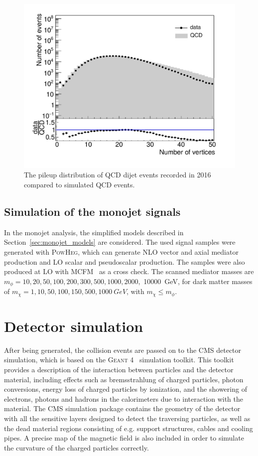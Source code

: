 \begin{itemize}
\begin{figure}[ht]
  \centering
 \includegraphics[width=.75\textwidth]{pileup.pdf} 
 \caption{The pileup distribution of QCD dijet events recorded in 2016 compared to simulated QCD events.}
 \label{fig:pileup}
\end{figure}
 \end{itemize}

\subsection{Simulation of the monojet signals}
\label{sec:monojet_sim}

In the monojet analysis, the simplified models described in Section~\ref{sec:monojet_models} are considered. The used signal samples were generated with \textsc{PowHeg}, which can generate \ac{NLO} vector and axial mediator production and \ac{LO} scalar and pseudoscalar production. The samples were also produced at \ac{LO} with MCFM~\cite{Campbell:2010ff} as a cross check. The scanned mediator masses are $m_{\phi} = 10, 20, 50, 100, 200, 300, 500, 1000, 2000,$ \SI{10000}{GeV}, for dark matter masses of $m_{\chi} = 1, 10, 50, 100, 150, 500, \SI{1000}{GeV}$, with $m_{\chi} \leq m_{\phi}$.

\section{Detector simulation}
\label{sec:sim}

After being generated, the collision events are passed on to the \ac{CMS} detector simulation, which is based on the \textsc{Geant 4}~\cite{Allison:2006ve} simulation toolkit. This toolkit provides a description of the interaction between particles and the detector material, including effects such as bremsstrahlung of charged particles, photon conversions, energy loss of charged particles by ionization, and the showering of electrons, photons and hadrons in the calorimeters due to interaction with the material. The \ac{CMS} simulation package contains the geometry of the detector with all the sensitive layers designed to detect the traversing particles, as well as the dead material regions consisting of e.g. support structures, cables and cooling pipes. A precise map of the magnetic field is also included in order to simulate the curvature of the charged particles correctly.


